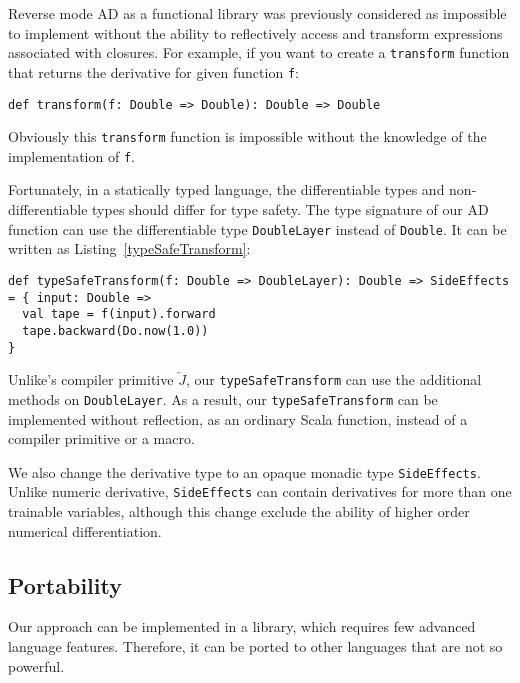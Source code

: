 Reverse mode AD as a functional library was previously considered as impossible to implement without the ability to reflectively access and transform expressions associated with closures\cite{pearlmutter2008reverse}. For example, if you want to create a \lstinline{transform} function that returns the derivative for given function \lstinline{f}:

\begin{lstlisting}[float={h t b p},caption={Impossible transform function for AD}, label={transform}]
def transform(f: Double => Double): Double => Double
\end{lstlisting}

Obviously this \lstinline{transform} function is impossible without the knowledge of the implementation of \lstinline{f}.

Fortunately, in a statically typed language, the differentiable types and non-differentiable types should differ for type safety. The type signature of our AD function can use the differentiable type \lstinline{DoubleLayer} instead of \lstinline{Double}. It can be written as Listing~\ref{typeSafeTransform}:

\begin{lstlisting}[float={h t b p},caption={Type safe transform function for AD}, label={typeSafeTransform}]
def typeSafeTransform(f: Double => DoubleLayer): Double => SideEffects = { input: Double =>
  val tape = f(input).forward
  tape.backward(Do.now(1.0))
}
\end{lstlisting}

Unlike\cite{pearlmutter2008reverse}'s compiler primitive $\overleftarrow{J}$, our \lstinline{typeSafeTransform} can use the additional methods on \lstinline{DoubleLayer}. As a result, our \lstinline{typeSafeTransform} can be implemented without reflection, as an ordinary Scala function, instead of a compiler primitive or a macro.

We also change the derivative type to an opaque monadic type \lstinline{SideEffects}. Unlike numeric derivative, \lstinline{SideEffects} can contain derivatives for more than one \glspl{trainable variable}, although this change exclude the ability of higher order numerical differentiation.

\subsection{Portability}
\label{portability}

Our approach can be implemented in a library, which requires few advanced language features. Therefore, it can be ported to other languages that are not so powerful.

